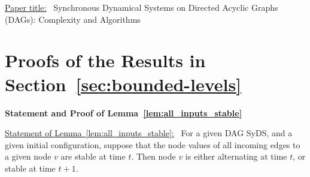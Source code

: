 
\appendix

\onecolumn

\begin{center}
\end{center}

\bigskip

\noindent
\underline{Paper title:}~
Synchronous Dynamical Systems on Directed Acyclic Graphs (DAGs): 
Complexity and Algorithms

\bigskip

\noindent
\section{Proofs of the Results in Section~\ref{sec:bounded-levels}}

\medskip

\iffalse
\noindent
\textbf{Statement and Proof of Proposition~\ref{pro:long_phase_space_cycle}}

\medskip

\underline{Statement of Proposition~\ref{pro:long_phase_space_cycle}:}~
For every $n  > 1$, there is an $n$ node DAG SyDS
whose phase space graph is a cycle of length $2^n$.

\medskip

\noindent
\textbf{Proof:}~
For a given $n > 1$ we construct the DAG SyDS $S_n$ to be a counter,
as follows.  The underlying graph contains $n$ levels, one node per
level.  For each node, there is an incoming edge from the nodes on
each of the lower levels.  The transition function for each node
is the function that retains the current value of the node if any
of the lower order bits is 0, and changes the value of the node if
all of the lower order bits are 1.

Suppose a given configuration of $S_n$ is interpreted as encoding
an integer $k$, $0 \leq k < 2^n$.  Then the successor configuration
encodes the integer $k + 1 \mod 2^n$.  Thus, the phase space of
$S_n$ is a cycle of length $2^n$.  \QED
\fi


\noindent
\textbf{Statement and Proof of Lemma~\ref{lem:all_inputs_stable}}

\medskip

\underline{Statement of Lemma~\ref{lem:all_inputs_stable}:}~
For a given DAG SyDS, and a given initial configuration, suppose
that the node values of all incoming edges to a given node $v$ are
stable at time $t$.  Then node $v$ is either alternating at time
$t$, or stable at time $t+1$.

